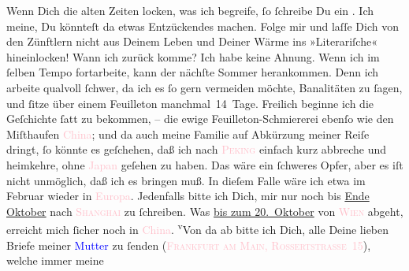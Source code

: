                Wenn Dich die  alten Zeiten locken, was ich begreife, ſo
               ſchreibe Du ein \label{K_L02854-112v}\label{K_L02854-112h}. Ich meine, Du
               könnteſt da etwas Entzückendes machen. Folge mir und laſſe Dich von den Zünftlern
               nicht aus Deinem Leben und Deiner Wärme ins »Literariſche« hineinlocken!\pend
           \pstart
           {\pb}Wann ich zurück komme? Ich habe keine Ahnung. Wenn
               ich im ſelben Tempo fortarbeite, kann der nächſte Sommer herankommen. Denn ich
               arbeite qualvoll ſchwer, da ich es ſo gern vermeiden möchte, Banalitäten zu ſagen,
               und ſitze über einem Feuilleton manchmal 14 Tage. Freilich beginne ich die Geſchichte
               ſatt zu bekommen, – die ewige Feuilleton-Schmiererei ebenſo wie den Miſthaufen \textcolor{pink}{China}{}\ledrightnote{\textcolor{pink}{China}}; und da  auch meine Familie auf Abkürzung meiner Reiſe {\pb}dringt, ſo könnte es geſchehen, daß ich nach \textsc{\textcolor{pink}{Peking}{}\ledrightnote{\textcolor{pink}{Peking}}} einfach kurz abbreche und heimkehre, ohne \textcolor{pink}{Japan}{}\ledrightnote{\textcolor{pink}{Japan}} geſehen zu haben. Das wäre ein ſchweres Opfer, aber es iſt nicht
               unmöglich, daß ich es bringen muß. In dieſem Falle wäre ich etwa im Februar wieder in \textcolor{pink}{Europa}{}\ledrightnote{\textcolor{pink}{Europa}}. Jedenfalls bitte ich Dich, mir nur noch bis \uline{Ende Oktober} nach \textsc{\textcolor{pink}{Shanghai}{}\ledrightnote{\textcolor{pink}{Shanghai}}} zu ſchreiben. Was \uline{bis zum 20. Oktober} von \textsc{\textcolor{pink}{Wien}{}\ledrightnote{\textcolor{pink}{Wien}}} abgeht, erreicht mich ſicher noch in \textcolor{pink}{China}{}\ledrightnote{\textcolor{pink}{China}}. {\pb}\substVorne{}\textsuperscript{v}\substDazwischen{}V\substHinten{}on da ab bitte ich Dich, alle Deine 
               lieben Briefe meiner \textcolor{blue}{Mutter}{}
               zu ſenden (\textsc{\textcolor{pink}{Frankfurt am Main,  Rossertstraße 15}{}\ledrightnote{\textcolor{pink}{Rossertstraße}}}), welche  immer meine

